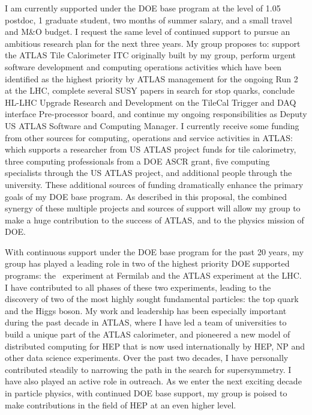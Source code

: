 
I am currently supported under the DOE base program at the level of 1.05 postdoc, 1 graduate student, two months of summer salary, and a small travel and M\&O budget. I request the same level of continued support to pursue an ambitious research plan for the next three years. My group proposes to: support the ATLAS Tile Calorimeter ITC originally built by my group, perform urgent software development and computing operations activities which have been identified as the highest priority by ATLAS management for the ongoing Run 2 at the LHC, complete several SUSY papers in search for stop quarks, conclude HL-LHC Upgrade Research and Development on the TileCal Trigger and DAQ interface Pre-processor board, and continue my ongoing responsibilities as Deputy US ATLAS Software and Computing Manager. I currently receive some funding from other sources for computing, operations and service activities in ATLAS: which supports a researcher from US ATLAS project funds for tile calorimetry, three computing professionals from a DOE ASCR grant, five computing specialists through the US ATLAS project, and additional people through the university. These additional sources of funding dramatically enhance the primary goals of my DOE base program. As described in this proposal, the combined synergy of these multiple projects and sources of support will allow my group to make a huge contribution to the success of ATLAS, and to the physics mission of DOE.

With continuous support under the DOE base program for the past 20 years, my group has played a leading role in two of the highest priority DOE supported programs: the \ experiment at Fermilab and the ATLAS experiment at the LHC. I have contributed to all phases of these two experiments, leading to the discovery of two of the most highly sought fundamental particles: the top quark and the Higgs boson. My work and leadership has been especially important during the past decade in ATLAS, where I have led a team of universities to build a unique part of the ATLAS calorimeter, and pioneered a new model of distributed computing for HEP that is now used internationally by HEP, NP and other data science experiments. Over the past two decades, I have personally contributed steadily to narrowing the path in the search for supersymmetry. I have also played an active role in outreach. As we enter the next exciting decade in particle physics, with continued DOE base support, my group is poised to make contributions in the field of HEP at an even higher level.

